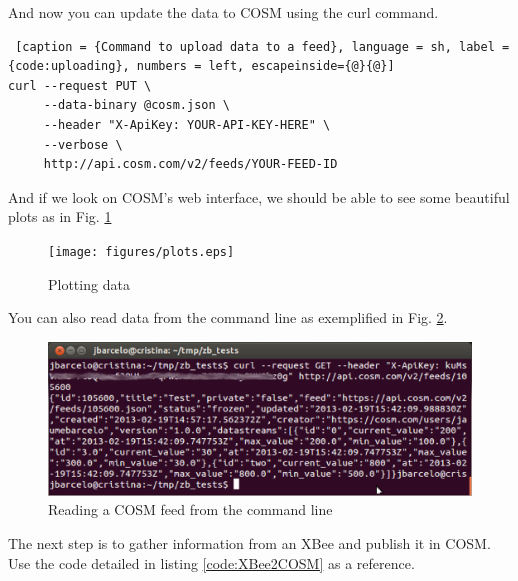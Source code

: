 And now you can update the data to COSM using the curl command.

\begin{lstlisting} [caption = {Command to upload data to a feed}, language = sh, label = {code:uploading}, numbers = left, escapeinside={@}{@}]
curl --request PUT \
     --data-binary @cosm.json \
     --header "X-ApiKey: YOUR-API-KEY-HERE" \
     --verbose \
     http://api.cosm.com/v2/feeds/YOUR-FEED-ID
\end{lstlisting}

And if we look on COSM's web interface, we should be able to see some beautiful plots as in Fig. \ref{fig:plots}

\begin{figure}[htbp]
  \centering
  \texttt{[image: figures/plots.eps]}
  \caption{Plotting data}
  \label{fig:plots}
\end{figure}

You can also read data from the command line as exemplified in Fig. \ref{fig:reading-cosm}.

\begin{figure}[htbp]
  \centering
  \includegraphics[width=0.9\linewidth]{figures/reading-cosm.eps}
  \caption{Reading a COSM feed from the command line}
  \label{fig:reading-cosm}
\end{figure}

The next step is to gather information from an XBee and publish it in COSM.
Use the code detailed in listing \ref{code:XBee2COSM} as a reference.

